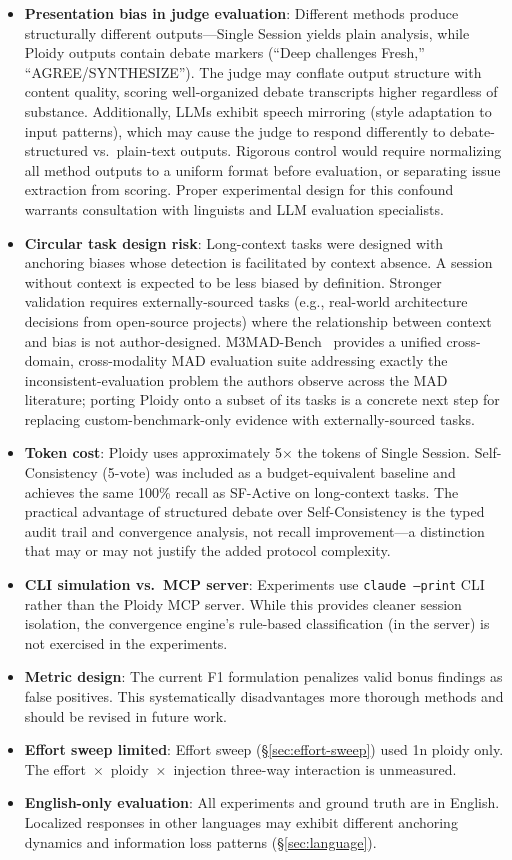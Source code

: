 \documentclass[11pt]{article}
\begin{document}
\begin{itemize}[leftmargin=1.5em]
  \item \textbf{Presentation bias in judge evaluation}: Different methods produce structurally different outputs---Single Session yields plain analysis, while Ploidy outputs contain debate markers (``Deep challenges Fresh,'' ``AGREE/SYNTHESIZE''). The judge may conflate output structure with content quality, scoring well-organized debate transcripts higher regardless of substance. Additionally, LLMs exhibit speech mirroring (style adaptation to input patterns), which may cause the judge to respond differently to debate-structured vs.\ plain-text outputs. Rigorous control would require normalizing all method outputs to a uniform format before evaluation, or separating issue extraction from scoring. Proper experimental design for this confound warrants consultation with linguists and LLM evaluation specialists.
  \item \textbf{Circular task design risk}: Long-context tasks were designed with anchoring biases whose detection is facilitated by context absence. A session without context is expected to be less biased by definition. Stronger validation requires externally-sourced tasks (e.g., real-world architecture decisions from open-source projects) where the relationship between context and bias is not author-designed. M3MAD-Bench~\citep{li2026m3madbench} provides a unified cross-domain, cross-modality MAD evaluation suite addressing exactly the inconsistent-evaluation problem the authors observe across the MAD literature; porting Ploidy onto a subset of its tasks is a concrete next step for replacing custom-benchmark-only evidence with externally-sourced tasks.
  \item \textbf{Token cost}: Ploidy uses approximately 5$\times$ the tokens of Single Session. Self-Consistency (5-vote) was included as a budget-equivalent baseline and achieves the same 100\% recall as SF-Active on long-context tasks. The practical advantage of structured debate over Self-Consistency is the typed audit trail and convergence analysis, not recall improvement---a distinction that may or may not justify the added protocol complexity.
  \item \textbf{CLI simulation vs.\ MCP server}: Experiments use \texttt{claude --print} CLI rather than the Ploidy MCP server. While this provides cleaner session isolation, the convergence engine's rule-based classification (in the server) is not exercised in the experiments.
  \item \textbf{Metric design}: The current F1 formulation penalizes valid bonus findings as false positives. This systematically disadvantages more thorough methods and should be revised in future work.
  \item \textbf{Effort sweep limited}: Effort sweep (\S\ref{sec:effort-sweep}) used 1n ploidy only. The effort~$\times$~ploidy~$\times$~injection three-way interaction is unmeasured.
  \item \textbf{English-only evaluation}: All experiments and ground truth are in English. Localized responses in other languages may exhibit different anchoring dynamics and information loss patterns (\S\ref{sec:language}).
\end{itemize}
\end{document}
